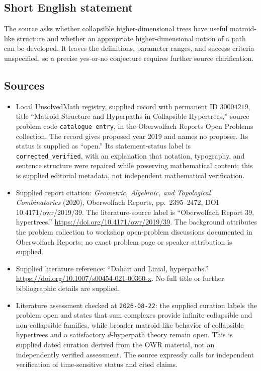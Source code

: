 \documentclass[11pt]{article}
\begin{document}
\subsection{Short English statement}
The source asks whether collapsible higher-dimensional trees have useful matroid-like structure and whether an appropriate higher-dimensional notion of a path can be developed. It leaves the definitions, parameter ranges, and success criteria unspecified, so a precise yes-or-no conjecture requires further source clarification.
\subsection{Sources}
\begin{itemize}
\item Local UnsolvedMath registry, supplied record with permanent ID \(30004219\), title ``Matroid Structure and Hyperpaths in Collapsible Hypertrees,'' source problem code \texttt{catalogue entry}, in the Oberwolfach Reports Open Problems collection. The record gives proposed year 2019 and names no proposer. Its status is supplied as ``open.'' Its statement-status label is \texttt{corrected\_verified}, with an explanation that notation, typography, and sentence structure were repaired while preserving mathematical content; this is supplied editorial metadata, not independent mathematical verification.
\item Supplied report citation: \emph{Geometric, Algebraic, and Topological Combinatorics} (2020), Oberwolfach Reports, pp.\ 2395--2472, DOI 10.4171/owr/2019/39. The literature-source label is ``Oberwolfach Report 39, hypertrees.'' \url{https://doi.org/10.4171/owr/2019/39}. The background attributes the problem collection to workshop open-problem discussions documented in Oberwolfach Reports; no exact problem page or speaker attribution is supplied.
\item Supplied literature reference: ``Dahari and Linial, hyperpaths.'' \url{https://doi.org/10.1007/s00454-021-00360-x}. No full title or further bibliographic details are supplied.
\item Literature assessment checked at \texttt{2026-08-22}: the supplied curation labels the problem open and states that sum complexes provide infinite collapsible and non-collapsible families, while broader matroid-like behavior of collapsible hypertrees and a satisfactory \(d\)-hyperpath theory remain open. This is supplied dated curation derived from the OWR material, not an independently verified assessment. The source expressly calls for independent verification of time-sensitive status and cited claims.
\end{itemize}
\end{document}
